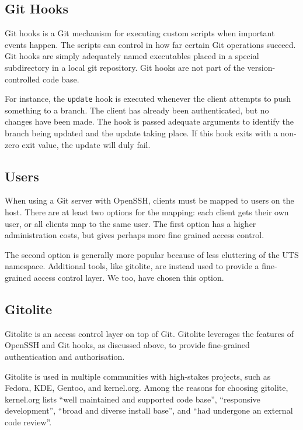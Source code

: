 \subsection{Git Hooks}

Git hooks is a Git mechanism for executing custom scripts when important events
happen\cite{man-5-githooks}. The scripts can control in how far certain Git
operations succeed. Git hooks are simply adequately named executables placed in
a special subdirectory in a local git repository. Git hooks are not part of the
version-controlled code base.

For instance, the \texttt{update} hook is executed whenever the client attempts
to push something to a branch. The client has already been authenticated, but
no changes have been made. The hook is passed adequate arguments to identify
the branch being updated and the update taking place. If this hook exits with a
non-zero exit value, the update will duly fail.

\subsection{Users}

When using a Git server with OpenSSH, clients must be mapped to users on the
host. There are at least two options for the mapping: each client gets their
own user, or all clients map to the same user. The first option has a higher
administration costs, but gives perhaps more fine grained access control.

The second option is generally more popular because of less cluttering of the
UTS namespace. Additional tools, like gitolite, are instead used to provide a
fine-grained access control layer. We too, have chosen this option.

\subsection{Gitolite}

Gitolite is an access control layer on top of Git\cite{gitolite-com-2014a}.
Gitolite leverages the features of OpenSSH and Git hooks, as discussed above,
to provide fine-grained authentication and
authorisation\cite{gitolite-com-2014b}.

Gitolite is used in multiple communities with high-stakes projects, such as
Fedora, KDE, Gentoo, and kernel.org\cite{gitolite-com-2014c}. Among the reasons
for choosing gitolite, kernel.org lists\cite{kernel-org-2014} ``well maintained
and supported code base'', ``responsive development'', ``broad and diverse
install base'', and ``had undergone an external code
review''\cite{gitolite-google-group-2011}.

